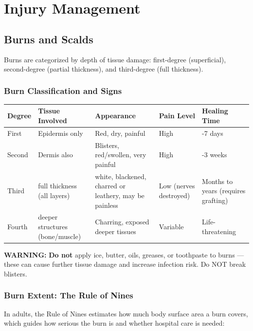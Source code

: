 \chapter{Injury Management}

\section{Burns and Scalds}

Burns are categorized by depth of tissue damage: first-degree (superficial), second-degree (partial thickness), and third-degree (full thickness).

\subsection{Burn Classification and Signs}

\begin{center}
\small
\begin{tabularx}{\textwidth}{@{}>{\raggedright\arraybackslash}l>{\raggedright\arraybackslash}X>{\raggedright\arraybackslash}X>{\raggedright\arraybackslash}X>{\raggedright\arraybackslash}X@{}}

\hline
\textbf{Degree} & \textbf{Tissue Involved} & \textbf{Appearance} & \textbf{Pain Level} & \textbf{Healing Time} \\
\hline
First & Epidermis only & Red, dry, painful & High & 3-7 days \\
Second & Dermis also & Blisters, red/swollen, very painful & High & 2-3 weeks \\
Third & full thickness (all layers) & white, blackened, charred or leathery, may be painless & Low (nerves destroyed) & Months to years (requires grafting) \\
Fourth & deeper structures (bone/muscle) & Charring, exposed deeper tissues & Variable & Life-threatening \\
\hline
\end{tabularx}
\end{center}

\textbf{WARNING:} \textbf{Do not} apply ice, butter, oils, greases, or toothpaste to burns — these can cause further tissue damage and increase infection risk. Do NOT break blisters.

\subsection{Burn Extent: The Rule of Nines}

In adults, the Rule of Nines estimates how much body surface area a burn covers, which guides how serious the burn is and whether hospital care is needed:


